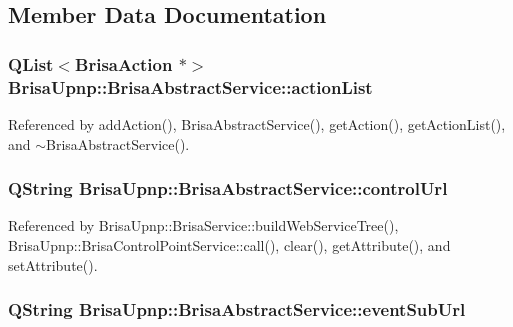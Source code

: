 \subsection{Member Data Documentation}
\hypertarget{classBrisaUpnp_1_1BrisaAbstractService_a58ee35d99146f1f3055dc4a0abfe7282}{
\subsubsection[{actionList}]{\setlength{\rightskip}{0pt plus 5cm}QList$<${\bf BrisaAction} $\ast$$>$ {\bf BrisaUpnp::BrisaAbstractService::actionList}}}
\label{classBrisaUpnp_1_1BrisaAbstractService_a58ee35d99146f1f3055dc4a0abfe7282}


Referenced by addAction(), BrisaAbstractService(), getAction(), getActionList(), and $\sim$BrisaAbstractService().\hypertarget{classBrisaUpnp_1_1BrisaAbstractService_acc5a45e07d8da5d8e086b02f4a22cc78}{
\subsubsection[{controlUrl}]{\setlength{\rightskip}{0pt plus 5cm}QString {\bf BrisaUpnp::BrisaAbstractService::controlUrl}}}
\label{classBrisaUpnp_1_1BrisaAbstractService_acc5a45e07d8da5d8e086b02f4a22cc78}


Referenced by BrisaUpnp::BrisaService::buildWebServiceTree(), BrisaUpnp::BrisaControlPointService::call(), clear(), getAttribute(), and setAttribute().\hypertarget{classBrisaUpnp_1_1BrisaAbstractService_a81d2525c94d2b9572c962089c388f8f9}{
\subsubsection[{eventSubUrl}]{\setlength{\rightskip}{0pt plus 5cm}QString {\bf BrisaUpnp::BrisaAbstractService::eventSubUrl}}}
\label{classBrisaUpnp_1_1BrisaAbstractService_a81d2525c94d2b9572c962089c388f8f9}


